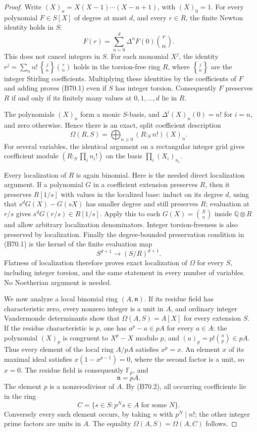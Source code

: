 \begin{proof}
Write $(X)_n=X(X-1)\cdots(X-n+1)$, with $(X)_0=1$.
For every polynomial $F\in S[X]$ of degree at most $d$, and every $r\in R$,
the finite Newton identity holds in $S$:
\[
               F(r)=\sum_{n=0}^d \Delta^nF(0)\binom r n.  \tag{B70.1}
\]
This does not cancel integers in $S$. For each monomial $X^j$, the
identity $r^j=\sum_n n!\,{j\brace n}\binom r n$ holds in the
torsion-free ring $R$, where ${j\brace n}$ are the integer Stirling
coefficients. Multiplying these identities by the coefficients of $F$
and adding proves (B70.1) even if $S$ has integer torsion.
Consequently $F$ preserves $R$ if and only if its finitely many values
at $0,1,\ldots,d$ lie in $R$.

The polynomials $(X)_n$ form a monic $S$-basis, and
$\Delta^i(X)_n(0)=n!$ for $i=n$, and zero otherwise. Hence there is an
exact, split coefficient description
\[
 \Omega(R,S)=\bigoplus_{n\ge0}(R:_S n!)(X)_n.              \tag{B70.2}
\]
For several variables, the identical argument on a rectangular integer
grid gives coefficient module
$(R:_S\prod_i n_i!)$ on the basis $\prod_i(X_i)_{n_i}$.

Every localization of $R$ is again binomial. Here is the needed direct
localization argument. If a polynomial $G$ in a coefficient extension
preserves $R$, then it preserves $R[1/s]$ with values in the localized
base: induct on its degree $d$, using that
$s^dG(X)-G(sX)$ has smaller degree and still preserves $R$; evaluation
at $r/s$ gives $s^dG(r/s)\in R[1/s]$. Apply this to each
$G(X)=\binom X n$ inside $\mathbb Q\otimes R$ and allow arbitrary
localization denominators. Integer torsion-freeness is also preserved
by localization. Finally the degree-bounded preservation condition in
(B70.1) is the kernel of the finite evaluation map
\[
          S^{d+1}\longrightarrow (S/R)^{d+1}.
\]
Flatness of localization therefore proves exact localization of
$\Omega$ for every $S$, including integer torsion, and the same statement
in every number of variables. No Noetherian argument is needed.

We now analyze a local binomial ring $(A,\mathfrak n)$.
If its residue field has characteristic zero, every nonzero integer is
a unit in $A$, and ordinary integer Vandermonde determinants show that
$\Omega(A,S)=A[X]$ for every extension $S$.
If the residue characteristic is $p$, one has
$a^p-a\in pA$ for every $a\in A$: the polynomial $(X)_p$ is congruent to
$X^p-X$ modulo $p$, and $(a)_p=p!\binom a p\in pA$.
Thus every element of the local ring $A/pA$ satisfies $x^p=x$.
An element $x$ of its maximal ideal satisfies
$x(1-x^{p-1})=0$, where the second factor is a unit, so $x=0$.
The residue field is consequently $\mathbb F_p$, and
\[
                           \mathfrak n=pA.                \tag{B70.3}
\]
The element $p$ is a nonzerodivisor of $A$.
By (B70.2), all occurring coefficients lie in the ring
\[
                   C=\{s\in S:p^Ns\in A
                                  \text{ for some }N\}.  \tag{B70.4}
\]
Conversely every such element occurs, by taking $n$ with $p^N\mid n!$;
the other integer prime factors are units in $A$.
The equality $\Omega(A,S)=\Omega(A,C)$ follows.


\end{proof}
